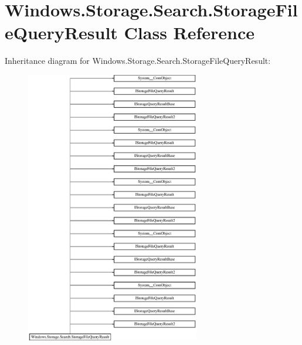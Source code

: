 \hypertarget{class_windows_1_1_storage_1_1_search_1_1_storage_file_query_result}{}\section{Windows.\+Storage.\+Search.\+Storage\+File\+Query\+Result Class Reference}
\label{class_windows_1_1_storage_1_1_search_1_1_storage_file_query_result}
Inheritance diagram for Windows.\+Storage.\+Search.\+Storage\+File\+Query\+Result\+:\begin{figure}[H]
\begin{center}
\leavevmode
\includegraphics[height=12.000000cm]{class_windows_1_1_storage_1_1_search_1_1_storage_file_query_result}
\end{center}
\end{figure}
